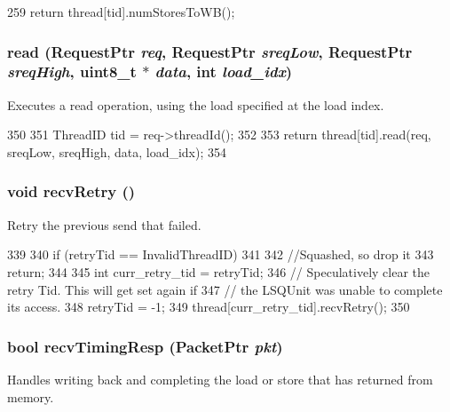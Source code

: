 \begin{DoxyCode}
259     { return thread[tid].numStoresToWB(); }
\end{DoxyCode}
\hypertarget{classLSQ_a206ad0283d431e78e6f38bb9b54b23ee}{
\subsubsection[{read}]{ read ({\bf RequestPtr} {\em req}, \/  {\bf RequestPtr} {\em sreqLow}, \/  {\bf RequestPtr} {\em sreqHigh}, \/  uint8\_\-t $\ast$ {\em data}, \/  int {\em load\_\-idx})}}
\label{classLSQ_a206ad0283d431e78e6f38bb9b54b23ee}
Executes a read operation, using the load specified at the load index. 


\begin{DoxyCode}
350 {
351     ThreadID tid = req->threadId();
352 
353     return thread[tid].read(req, sreqLow, sreqHigh, data, load_idx);
354 }
\end{DoxyCode}
\hypertarget{classLSQ_a29cb5a4f98063ce6e9210eacbdb35298}{
\subsubsection[{recvRetry}]{\setlength{\rightskip}{0pt plus 5cm}void recvRetry ()}}
\label{classLSQ_a29cb5a4f98063ce6e9210eacbdb35298}
Retry the previous send that failed. 


\begin{DoxyCode}
339 {
340     if (retryTid == InvalidThreadID)
341     {
342         //Squashed, so drop it
343         return;
344     }
345     int curr_retry_tid = retryTid;
346     // Speculatively clear the retry Tid.  This will get set again if
347     // the LSQUnit was unable to complete its access.
348     retryTid = -1;
349     thread[curr_retry_tid].recvRetry();
350 }
\end{DoxyCode}
\hypertarget{classLSQ_a482dba5588f4bee43e498875a61e5e0b}{
\subsubsection[{recvTimingResp}]{\setlength{\rightskip}{0pt plus 5cm}bool recvTimingResp ({\bf PacketPtr} {\em pkt})}}
\label{classLSQ_a482dba5588f4bee43e498875a61e5e0b}
Handles writing back and completing the load or store that has returned from memory.


